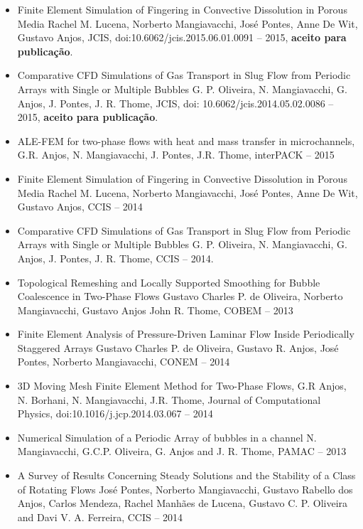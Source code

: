 \documentclass[a4paper,portuges,12pt]{article}
\begin{document}
\begin{itemize}
	\item Finite Element Simulation of Fingering in Convective Dissolution in
		  Porous Media Rachel M. Lucena, Norberto Mangiavacchi, José
		  Pontes, Anne De Wit, Gustavo Anjos, JCIS,
		  doi:10.6062/jcis.2015.06.01.0091 -- 2015, \textbf{aceito para
		  publicação}.
	\item Comparative CFD Simulations of Gas Transport in Slug Flow from
		  Periodic Arrays with Single or Multiple Bubbles G. P.
		  Oliveira, N. Mangiavacchi, G. Anjos, J. Pontes, J. R. Thome,
		  JCIS, doi: 10.6062/jcis.2014.05.02.0086 -- 2015,
		  \textbf{aceito para publicação}.
	\item ALE-FEM for two-phase flows with heat and mass transfer in
	      microchannels, G.R. Anjos, N. Mangiavacchi, J. Pontes, J.R. Thome,
		  interPACK -- 2015
	\item Finite Element Simulation of Fingering in Convective Dissolution in
	      Porous Media Rachel M. Lucena, Norberto Mangiavacchi, José Pontes,
	      Anne De Wit, Gustavo Anjos, CCIS -- 2014
	\item Comparative CFD Simulations of Gas Transport in Slug Flow from
		  Periodic Arrays with Single or Multiple Bubbles G. P.
		  Oliveira, N. Mangiavacchi, G. Anjos, J. Pontes, J. R. Thome,
		  CCIS -- 2014.
	\item Topological Remeshing and Locally Supported Smoothing for
	      Bubble Coalescence in Two-Phase Flows
		  Gustavo Charles P. de Oliveira, Norberto Mangiavacchi, Gustavo Anjos
		  John R. Thome, COBEM -- 2013
	\item Finite Element Analysis of Pressure-Driven Laminar Flow Inside
	      Periodically Staggered Arrays
		  Gustavo Charles P. de Oliveira, Gustavo R. Anjos, José Pontes,
		  Norberto Mangiavacchi, CONEM -- 2014
	\item 3D Moving Mesh Finite Element Method for Two-Phase Flows, G.R
	      Anjos, N. Borhani, N.  Mangiavacchi, J.R. Thome,  Journal of
		  Computational Physics, doi:10.1016/j.jcp.2014.03.067 -- 2014
	\item Numerical Simulation of a Periodic Array of bubbles in a
		  channel N. Mangiavacchi, G.C.P. Oliveira, G. Anjos and J. R.
		  Thome, PAMAC -- 2013
	\item A Survey of Results Concerning Steady Solutions and the
	      Stability of a Class of Rotating Flows
		  José Pontes, Norberto Mangiavacchi, Gustavo Rabello dos Anjos,
		  Carlos Mendeza, Rachel Manhães de Lucena, Gustavo C. P.
		  Oliveira and Davi V. A. Ferreira, CCIS -- 2014
\end{itemize}
\end{document}
